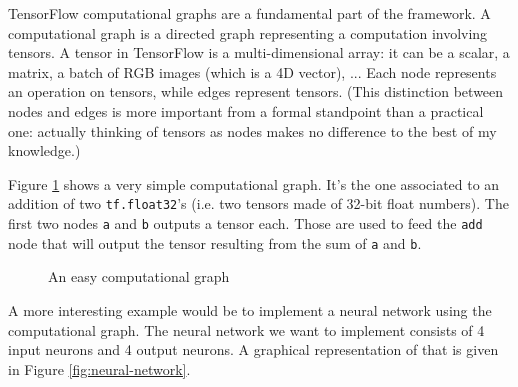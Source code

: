 TensorFlow computational graphs are a fundamental part of the
framework. A computational graph is a directed graph representing a
computation involving tensors. A tensor in TensorFlow is a
multi-dimensional array: it can be a scalar, a matrix, a batch of RGB
images (which is a 4D vector), ... Each node represents an operation on
tensors, while edges represent tensors. (This distinction between nodes
and edges is more important from a formal standpoint than a practical
one: actually thinking of tensors as nodes makes no difference to the
best of my knowledge.)

Figure \ref{fig:easy-graph} shows a very simple computational graph.
It's the one associated to an addition of two \texttt{tf.float32}'s
(i.e. two tensors made of 32-bit float numbers). The first two nodes
\texttt{a} and \texttt{b} outputs a tensor each. Those are used to feed
the \texttt{add} node that will output the tensor resulting from the
sum of \texttt{a} and \texttt{b}.

\begin{figure}[H]
  \centering
  \caption[easy-graph]{An easy computational graph}
  \label{fig:easy-graph}
\end{figure}

A more interesting example would be to implement a neural network using
the computational graph. The neural network we want to implement
consists of 4 input neurons and 4 output neurons. A graphical
representation of that is given in Figure \ref{fig:neural-network}.

